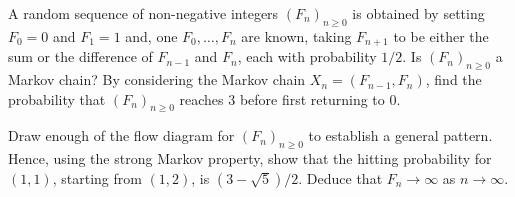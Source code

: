 \begin{problem}
A random sequence of non-negative integers $(F_n)_{n\geq 0}$ is obtained by setting $F_0=0$ and $F_1=1$ and, one $F_0,\dots,F_n$ are known, taking $F_{n+1}$ to be either the sum or the difference of $F_{n-1}$ and $F_n$, each with probability $1/2$. Is $(F_n)_{n\geq 0}$ a Markov chain? By considering the Markov chain $X_n=(F_{n-1},F_n)$, find the probability that $(F_n)_{n\geq 0}$ reaches 3 before first returning to 0.

Draw enough of the flow diagram for $(F_n)_{n\geq 0}$ to establish a general pattern. Hence, using the strong Markov property, show that the hitting probability for $(1,1)$, starting from $(1,2)$, is $(3-\sqrt{5})/2$. Deduce that $F_n\to \infty$ as $n\to \infty$.
\end{problem}

